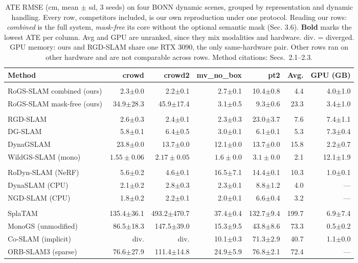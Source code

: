 \begin{table}[t]\centering\scriptsize\setlength{\tabcolsep}{2pt}
\begin{tabular}{>{\raggedright\arraybackslash}p{3.3cm}rrrrrr}\toprule
Method & crowd & crowd2 & mv\_no\_box & pt2 & Avg. & GPU (GB) \\ \midrule
\multicolumn{7}{l}{\emph{Ours, dynamic 3DGS}} \\
RoGS-SLAM combined (ours) & 2.3$\pm$0.0 & 2.2$\pm$0.1 & 2.7$\pm$0.1 & 10.4$\pm$0.8 & 4.4 & 4.0$\pm$1.0 \\
RoGS-SLAM mask-free (ours) & 34.9$\pm$28.3 & 45.9$\pm$17.4 & 3.1$\pm$0.5 & 9.3$\pm$0.6 & 23.3 & 3.4$\pm$1.0 \\
\midrule
\multicolumn{7}{l}{\emph{Dynamic 3DGS}} \\
RGD-SLAM & 2.6$\pm$0.3 & 2.4$\pm$0.1 & 2.3$\pm$0.3 & 23.0$\pm$3.7 & 7.6 & 7.4$\pm$1.1 \\
DG-SLAM & 5.8$\pm$0.1 & 6.4$\pm$0.5 & 3.0$\pm$0.1 & 6.1$\pm$0.1 & 5.3 & 7.3$\pm$0.4 \\
DynaGSLAM & 23.8$\pm$0.0 & 13.7$\pm$0.0 & 12.1$\pm$0.0 & 13.7$\pm$0.0 & 15.8 & 2.2$\pm$0.7 \\
WildGS-SLAM (mono) & {\boldmath$1.55\pm0.06$} & {\boldmath$2.17\pm0.05$} & {\boldmath$1.6\pm0.0$} & {\boldmath$3.1\pm0.0$} & 2.1 & 12.1$\pm$1.9 \\
\midrule
\multicolumn{7}{l}{\emph{Dynamic, non-3DGS}} \\
RoDyn-SLAM (NeRF) & 5.6$\pm$0.2 & 4.6$\pm$0.1 & 16.5$\pm$7.1 & 14.4$\pm$0.1 & 10.3 & 1.0$\pm$0.1 \\
DynaSLAM (CPU) & 2.1$\pm$0.2 & 2.8$\pm$0.3 & 2.3$\pm$0.1 & 8.8$\pm$1.2 & 4.0 & --- \\
NGD-SLAM (CPU) & 1.8$\pm$0.2 & 2.2$\pm$0.1 & 2.0$\pm$0.1 & 6.6$\pm$0.4 & 3.2 & --- \\
\midrule
\multicolumn{7}{l}{\emph{Static}} \\
SplaTAM & 135.4$\pm$36.1 & 493.2$\pm$470.7 & 37.4$\pm$0.4 & 132.7$\pm$9.4 & 199.7 & 6.9$\pm$7.4 \\
MonoGS (unmodified) & 86.5$\pm$18.3 & 147.5$\pm$39.0 & 15.3$\pm$9.5 & 43.8$\pm$8.6 & 73.3 & 0.5$\pm$0.2 \\
Co-SLAM (implicit) & div. & div. & 10.1$\pm$0.3 & 71.3$\pm$2.9 & 40.7 & 1.1$\pm$0.0 \\
ORB-SLAM3 (sparse) & 76.6$\pm$27.9 & 111.4$\pm$14.8 & 24.9$\pm$5.9 & 76.8$\pm$2.1 & 72.4 & --- \\
\bottomrule\end{tabular}
\caption{ATE RMSE (cm, mean $\pm$ sd, 3 seeds) on four BONN dynamic scenes, grouped by representation and dynamic handling. Every row, competitors included, is our own reproduction under one protocol. Reading our rows: \emph{combined} is the full system, \emph{mask-free} its core without the optional semantic mask (Sec. 3.6). \textbf{Bold} marks the lowest ATE per column. Avg and GPU are unranked, since they mix modalities and hardware. div. = diverged. GPU memory: ours and RGD-SLAM share one RTX 3090, the only same-hardware pair. Other rows ran on other hardware and are not comparable across rows. Method citations: Secs.~2.1--2.3.}\end{table}



